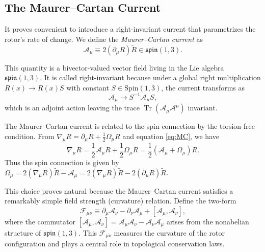 \documentclass[11pt,a4paper]{article}
\numberwithin{equation}{section}
\theoremstyle{plain}
\theoremstyle{definition}
\theoremstyle{remark}
\DeclareMathOperator{\Tr}{Tr}
\begin{document}
\subsection{The Maurer--Cartan Current}

It proves convenient to introduce a right-invariant current that parametrizes the rotor's rate of change. We define the \emph{Maurer--Cartan current} as
\begin{equation}
\mathcal{A}_\mu \equiv 2(\partial_\mu R)\widetilde{R}\in \mathfrak{spin}(1,3).
\label{eq:MC}
\end{equation}

This quantity is a bivector-valued vector field living in the Lie algebra $\mathfrak{spin}(1,3)$. It is called right-invariant because under a global right multiplication $R(x) \to R(x)S$ with constant $S \in \mathrm{Spin}(1,3)$, the current transforms as
\begin{equation}
\mathcal{A}_\mu \to S^{-1}\mathcal{A}_\mu S,
\end{equation}
which is an adjoint action leaving the trace $\Tr(\mathcal{A}_\mu \mathcal{A}^\mu)$ invariant.

The Maurer--Cartan current is related to the spin connection by the torsion-free condition. From $\nabla_\mu R = \partial_\mu R + \frac{1}{2}\Omega_\mu R$ and equation \eqref{eq:MC}, we have
\begin{equation}
\nabla_\mu R = \frac{1}{2}\mathcal{A}_\mu R + \frac{1}{2}\Omega_\mu R = \frac{1}{2}(\mathcal{A}_\mu + \Omega_\mu)R.
\label{eq:nabla-from-A}
\end{equation}
Thus the spin connection is given by $\Omega_\mu = 2(\nabla_\mu R)\widetilde{R} - \mathcal{A}_\mu = 2(\nabla_\mu R)\widetilde{R} - 2(\partial_\mu R)\widetilde{R}$.

This choice proves natural because the Maurer--Cartan current satisfies a remarkably simple field strength (curvature) relation. Define the two-form
\begin{equation}
\mathcal{F}_{\mu\nu} \equiv \partial_\mu\mathcal{A}_\nu - \partial_\nu\mathcal{A}_\mu + [\mathcal{A}_\mu, \mathcal{A}_\nu],
\label{eq:field-strength}
\end{equation}
where the commutator $[\mathcal{A}_\mu, \mathcal{A}_\nu] = \mathcal{A}_\mu \mathcal{A}_\nu - \mathcal{A}_\nu \mathcal{A}_\mu$ arises from the nonabelian structure of $\mathfrak{spin}(1,3)$. This $\mathcal{F}_{\mu\nu}$ measures the curvature of the rotor configuration and plays a central role in topological conservation laws.
\end{document}
